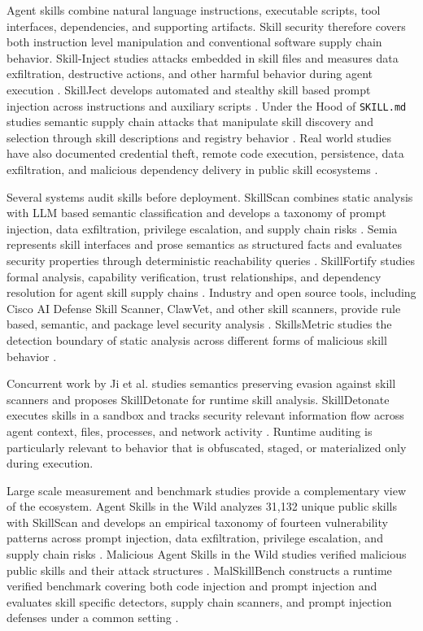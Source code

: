 Agent skills combine natural language instructions, executable scripts, tool
interfaces, dependencies, and supporting artifacts. Skill security therefore
covers both instruction level manipulation and conventional software supply
chain behavior. Skill-Inject studies attacks embedded in skill files and
measures data exfiltration, destructive actions, and other harmful behavior
during agent execution \cite{schmotz2026skillinject}. SkillJect develops
automated and stealthy skill based prompt injection across instructions and
auxiliary scripts \cite{skillject2026}. Under the Hood of
\texttt{SKILL.md} studies semantic supply chain attacks that manipulate skill
discovery and selection through skill descriptions and registry behavior
\cite{underhoodskillmd2026}. Real world studies have also documented
credential theft, remote code execution, persistence, data exfiltration, and
malicious dependency delivery in public skill ecosystems
\cite{skillscan2026,liu2026maliciousskillswild}.

Several systems audit skills before deployment. SkillScan combines static
analysis with LLM based semantic classification and develops a taxonomy of
prompt injection, data exfiltration, privilege escalation, and supply chain
risks \cite{skillscan2026}. Semia represents skill interfaces and prose
semantics as structured facts and evaluates security properties through
deterministic reachability queries \cite{wen2026semia}. SkillFortify studies
formal analysis, capability verification, trust relationships, and dependency
resolution for agent skill supply chains \cite{skillfortify2026}. Industry
and open source tools, including Cisco AI Defense Skill Scanner, ClawVet, and
other skill scanners, provide rule based, semantic, and package level security
analysis \cite{ciscoSkillScanner2026,clawvet2026,
syedabbastSkillScanner2026}. SkillsMetric studies the detection boundary of
static analysis across different forms of malicious skill behavior
\cite{chen2026skillsmetric}.

Concurrent work by Ji et al. studies semantics preserving evasion against
skill scanners and proposes SkillDetonate for runtime skill analysis.
SkillDetonate executes skills in a sandbox and tracks security relevant
information flow across agent context, files, processes, and network activity
\cite{ji2026cloakdetonate}. Runtime auditing is particularly relevant to
behavior that is obfuscated, staged, or materialized only during execution.

Large scale measurement and benchmark studies provide a complementary view of
the ecosystem. Agent Skills in the Wild analyzes 31,132 unique public skills
with SkillScan and develops an empirical taxonomy of fourteen vulnerability
patterns across prompt injection, data exfiltration, privilege escalation, and
supply chain risks \cite{skillscan2026}. Malicious Agent Skills in the Wild
studies verified malicious public skills and their attack structures
\cite{liu2026maliciousskillswild}. MalSkillBench constructs a runtime verified
benchmark covering both code injection and prompt injection and evaluates
skill specific detectors, supply chain scanners, and prompt injection defenses
under a common setting \cite{guo2026malskillbench}.

